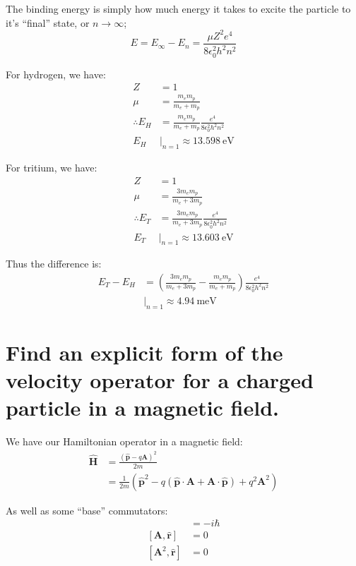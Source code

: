 \documentclass[a4paper]{scrartcl}
\begin{document}
The binding energy is simply how much energy it takes to excite the particle to it's ``final'' state, or \(n \to \infty\);
\[E = E_\infty - E_n = \frac{\mu Z^2 e^4}{8 \epsilon_0^2 h^2 n^2}\]

For hydrogen, we have:
\begin{align*}
    Z &= 1 \\
    \mu &= \frac{m_e m_p}{m_e + m_p} \\
    \therefore E_H &= \frac{m_e m_p}{m_e + m_p} \frac{e^4}{8 \epsilon_0^2 h^2 n^2} \\
    E_H &\big|_{n = 1} \approx \SI{13.598}{\electronvolt}
\end{align*}

For tritium, we have:
\begin{align*}
    Z &= 1 \\
    \mu &= \frac{3 m_e m_p}{m_e + 3 m_p} \\
    \therefore E_T &= \frac{3 m_e m_p}{m_e + 3 m_p} \frac{e^4}{8 \epsilon_0^2 h^2 n^2} \\
    E_T &\big|_{n = 1} \approx \SI{13.603}{\electronvolt}
\end{align*}

Thus the difference is:
\begin{align*}
    E_T - E_H &= \left(\frac{3 m_e m_p}{m_e + 3 m_p} - \frac{m_e m_p}{m_e + m_p}\right) \frac{e^4}{8 \epsilon_0^2 h^2 n^2} \\
    &\big|_{n = 1} \approx \SI{4.94}{\milli\electronvolt}
\end{align*}

\section{Find an explicit form of the velocity operator for a charged particle in a magnetic field.}
We have our Hamiltonian operator in a magnetic field:
\begin{align*}
    \hat{\mathbf{H}} &= \frac{(\hat{\mathbf{p}} - q \mathbf{A})^2}{2 m} \\
    &= \frac{1}{2 m} \left(\hat{\mathbf{p}}^2 - q ( \hat{\mathbf{p}} \cdot \mathbf{A} + \mathbf{A} \cdot \hat{\mathbf{p}}) + q^2 \mathbf{A}^2\right)
\end{align*}

As well as some ``base'' commutators:
\begin{align*}
    [\hat{\mathbf{p}}, \hat{\mathbf{r}}] &= -i \hbar \\
    [\mathbf{A}, \hat{\mathbf{r}}] &= 0 \\
    [\mathbf{A}^2, \hat{\mathbf{r}}] &= 0
\end{align*}
\end{document}
